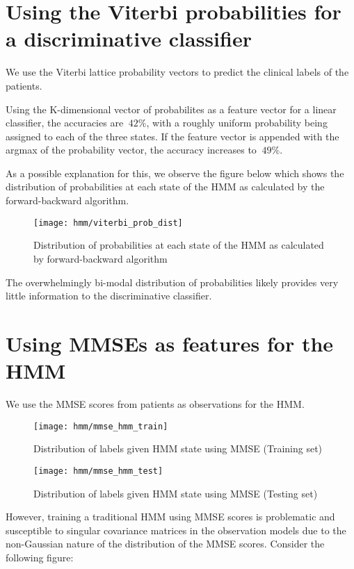 \documentclass[12pt,a4paper]{article}
\begin{document}
\section{Using the Viterbi probabilities for a discriminative classifier}

We use the Viterbi lattice probability vectors to predict the clinical
labels of the patients.

Using the K-dimensional vector of probabilites as a feature vector for
a linear classifier, the accuracies are $~42\%$, with a roughly
uniform probability being assigned to each of the three states. If the
feature vector is appended with the argmax of the probability vector,
the accuracy increases to $~49\%$. 

As a possible explanation for this, we observe the figure below which
shows the distribution of probabilities at each state of the HMM as
calculated by the forward-backward algorithm.

\begin{figure}[H]
  \centering
  \texttt{[image: hmm/viterbi\_prob\_dist]}
  \caption{Distribution of probabilities at each state of the HMM as
    calculated by forward-backward algorithm}  
\end{figure}

The overwhelmingly bi-modal distribution of probabilities likely
provides very little information to the discriminative classifier.

\section{Using MMSEs as features for the HMM}

We use the MMSE scores from patients as observations for the
HMM. 

\begin{figure}[H]
  \centering
  \texttt{[image: hmm/mmse\_hmm\_train]}
  \caption{Distribution of labels given HMM state using MMSE (Training set)}  
\end{figure}

\begin{figure}[H]
  \centering
  \texttt{[image: hmm/mmse\_hmm\_test]}
  \caption{Distribution of labels given HMM state using MMSE (Testing set)}  
\end{figure}

However, training a traditional HMM using MMSE scores is problematic
and susceptible to singular covariance matrices in the observation
models due to the non-Gaussian nature of the distribution of the MMSE
scores. Consider the following figure:
\end{document}
